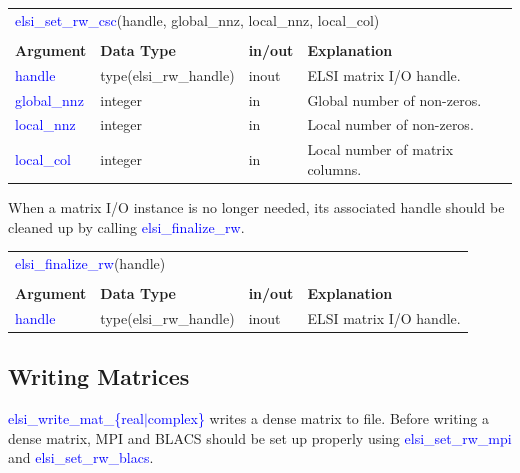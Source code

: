 \documentclass{report}
\newcommand{\tcb}[1]{\textcolor{blue}{#1}}
\begin{document}
\begin{tabular}[]{|p{20mm}|p{45mm}|p{15mm}|p{85mm}|}
\multicolumn{4}{l}{\tcb{elsi\_set\_rw\_csc}(handle, global\_nnz, local\_nnz, local\_col)}\\
\multicolumn{4}{l}{}\\
\hline
\multicolumn{1}{|l|}{\textbf{Argument}} & \multicolumn{1}{l|}{\textbf{Data Type}} & \multicolumn{1}{l|}{\textbf{in/out}} & \multicolumn{1}{l|}{\textbf{Explanation}}\\
\hline
\tcb{handle}      & type(elsi\_rw\_handle) & inout & ELSI matrix I/O handle.\\
\hline
\tcb{global\_nnz} & integer                & in    & Global number of non-zeros.\\
\hline
\tcb{local\_nnz}  & integer                & in    & Local number of non-zeros.\\
\hline
\tcb{local\_col}  & integer                & in    & Local number of matrix columns.\\
\hline
\end{tabular}

When a matrix I/O instance is no longer needed, its associated handle should be cleaned up by calling \tcb{elsi\_finalize\_rw}.

\begin{tabular}[]{|p{20mm}|p{45mm}|p{15mm}|p{85mm}|}
\multicolumn{4}{l}{\tcb{elsi\_finalize\_rw}(handle)}\\
\multicolumn{4}{l}{}\\
\hline
\multicolumn{1}{|l|}{\textbf{Argument}} & \multicolumn{1}{l|}{\textbf{Data Type}} & \multicolumn{1}{l|}{\textbf{in/out}} & \multicolumn{1}{l|}{\textbf{Explanation}}\\
\hline
\tcb{handle} & type(elsi\_rw\_handle) & inout & ELSI matrix I/O handle.\\
\hline
\end{tabular}

\subsection{Writing Matrices}
\label{subsec:rw_write}
\tcb{elsi\_write\_mat\_\{real$\vert$complex\}} writes a dense matrix to file. Before writing a dense matrix, MPI and BLACS should be set up properly using \tcb{elsi\_set\_rw\_mpi} and \tcb{elsi\_set\_rw\_blacs}.
\end{document}
